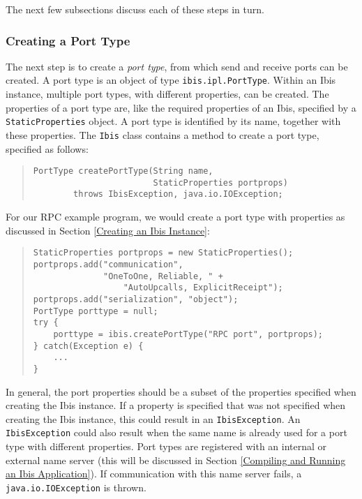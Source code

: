 \documentclass[10pt]{article}
\begin{document}
The next few subsections discuss each of these steps in turn.

\subsubsection{Creating a Port Type}

The next step is to create a \emph{port type}, from which
send and receive ports can be created. A port type is an object
of type \verb+ibis.ipl.PortType+.
Within an Ibis instance,
multiple port types, with different properties, can be created.
The properties of a port type are, like the required properties
of an Ibis, specified by a \verb+StaticProperties+ object.
A port type is identified by its name, together with these properties.
The \verb+Ibis+ class contains a method to create a port type,
specified as follows:
\begin{quote}
\begin{verbatim}
PortType createPortType(String name,
                        StaticProperties portprops)
        throws IbisException, java.io.IOException;
\end{verbatim}
\end{quote}

For our RPC example program, we would create a port type with properties
as discussed in Section \ref{Creating an Ibis Instance}:

\begin{quote}
\begin{verbatim}
StaticProperties portprops = new StaticProperties();
portprops.add("communication",
              "OneToOne, Reliable, " + 
                  "AutoUpcalls, ExplicitReceipt");
portprops.add("serialization", "object");
PortType porttype = null;
try {
    porttype = ibis.createPortType("RPC port", portprops);
} catch(Exception e) {
    ...
}
\end{verbatim}
\end{quote}

In general, the port properties should be a subset of the properties
specified when creating the Ibis instance. If a property is specified
that was not specified when creating the Ibis instance, this could
result in an \verb+IbisException+.
An \verb+IbisException+ could also result when the same name is
already used for a port type with different properties.
Port types are registered with an internal or external name server
(this will be discussed in Section \ref{Compiling and Running an Ibis Application}).
If communication with this name server fails, a
\verb+java.io.IOException+ is thrown.
\end{document}
